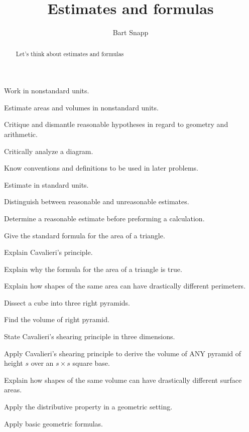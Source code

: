\documentclass[handout,nooutcomes,noauthor,12pt]{ximera}
\title{Estimates and formulas}
\author{Bart Snapp}
\begin{document}
\begin{abstract}
Let's think about estimates and formulas
\end{abstract}
\maketitle


\begin{listSectionOutcomes}
  \item{Work in nonstandard units.}
  \item{Estimate areas and volumes in nonstandard units.}
  \item{Critique and dismantle reasonable hypotheses in regard to geometry and arithmetic.}
  \item Critically analyze a diagram.
\item Know conventions and definitions to be used in later problems.
\item Estimate in standard units.
\item Distinguish between reasonable and unreasonable estimates.
\item Determine a reasonable estimate before preforming a calculation.
\item Give the standard formula for the area of a triangle.
\item Explain Cavalieri's principle.
\item Explain why the formula for the area of a triangle is true.
\item Explain how shapes of the same area can have drastically
  different perimeters.
  \item Dissect a cube into three right pyramids.
\item Find the volume of right pyramid.
\item State Cavalieri's shearing principle in three dimensions.
\item Apply Cavalieri's shearing principle to derive the volume of ANY pyramid
  of height $s$ over an $s\times s$ square base.
\item Explain how shapes of the same volume can have drastically
  different surface areas.
\item Apply the distributive property in a geometric setting.
\item Apply basic geometric formulas.
\end{listSectionOutcomes}



\end{document}
